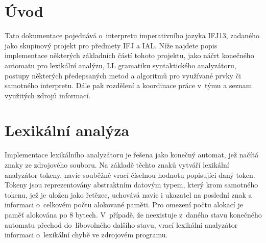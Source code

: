 \documentclass[12pt,a4paper,titlepage,final]{article}
\begin{document}

  \pagestyle{plain}
  \thispagestyle{empty}
  \tableofcontents
  \newpage


  \pagestyle{plain}
  \setcounter{page}{3}
  
  \setlength{\parindent}{1cm}
  \setlength{\parskip}{0.5cm plus4mm minus3mm}

  \section{Úvod} \label{uvod}

    Tato dokumentace pojednává o~interpretu imperativního jazyka IFJ13,
    zadaného jako skupi\-no\-vý projekt pro předmety IFJ a IAL. Níže najdete
    popis implementace některých základních částí tohoto projektu, jako
    náčrt konečného automatu pro lexikální analýzu, LL gramatiku syntaktického
    analyzátoru, postupy některých předepsaných metod a algoritmů pro
    využívané prvky či samotného interpretu. Dále pak rozdělení a koordinace
    práce v~týmu a seznam využitých zdrojů informací.
    \newpage

  \section{Lexikální analýza} \label{lexikalni-analyza}

    Implementace lexikálního analyzátoru je řešena jako konečný automat, jež
    načítá znaky ze zdrojového souboru. Na základě těchto znaků vytváří
    lexikální analyzátor tokeny, navíc souběžně vrací číselnou hodnotu
    popisující daný token. Tokeny jsou reprezentovány abstraktním datovým
    typem, který krom samotného tokenu, jež je uložen jako řetězec, uchovává
    navíc i ukazatel na poslední znak a informaci o~celkovém počtu alokované
    paměti. Pro omezení počtu alokací je paměť alokována po 8 bytech. 
    V~případě, že neexistuje z~daného stavu konečného automatu přechod
    do~libovolného dalšího stavu, vrací lexikální analyzátor informaci 
    o~lexikální chybě ve zdrojovém programu. 
\end{document}
